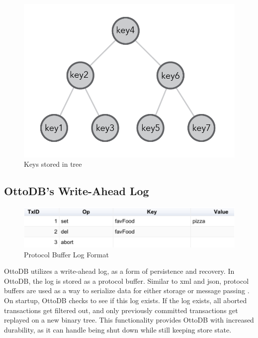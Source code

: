 \documentclass[conference]{IEEEtran}
\begin{document}
    \begin{figure}[h]
        \centering
        \includegraphics[width=\columnwidth]{figures/binaryTree.png}
        \caption{Keys stored in tree}
        \end{figure}

    \subsection{OttoDB's Write-Ahead Log}

    \begin{figure}[h]
        \centering
        \includegraphics[width=\columnwidth]{figures/logFormat.png}
        \caption{Protocol Buffer Log Format}
        \end{figure}

    OttoDB utilizes a write-ahead log, as a form of persistence and recovery. In OttoDB, the log is stored as a protocol buffer. Similar to xml and json, protocol buffers are used as a way to serialize data for either storage or message passing \cite{b22}. On startup, OttoDB checks to see if this log exists. If the log exists, all aborted transactions get filtered out, and only previously committed transactions get replayed on a new binary tree. This functionality provides OttoDB with increased durability, as it can handle being shut down while still keeping store state.
\end{document}

